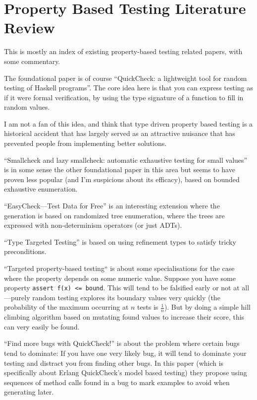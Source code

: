 \chapter{Property Based Testing Literature Review}

This is mostly an index of existing property-based testing related papers,
with some commentary.

The foundational paper is of course ``QuickCheck: a lightweight tool for random testing of Haskell programs''\cite{DBLP:conf/icfp/ClaessenH00}.
The core idea here is that you can express testing as if it were formal verification,
by using the type signature of a function to fill in random values.

I am not a fan of this idea,
and think that type driven property based testing is a historical accident that has largely served as an attractive nuisance that has prevented people from implementing better solutions.

``Smallcheck and lazy smallcheck: automatic exhaustive testing for small values''\cite{DBLP:conf/haskell/RuncimanNL08} is in some sense the other foundational paper in this area
but seems to have proven less popular (and I'm suspicious about its efficacy),
based on bounded exhaustive enumeration.

``EasyCheck---Test Data for Free''\cite{DBLP:conf/flops/ChristiansenF08} is an interesting extension where the generation is based on randomized tree enumeration,
where the trees are expressed with non-determinism operators (or just ADTs).

``Type Targeted Testing''\cite{DBLP:conf/esop/SeidelVJ15} is based on using refinement types to satisfy tricky preconditions.

``Targeted property-based testing``\cite{DBLP:conf/issta/LoscherS17} is about some specialisations for the case where the property depends on some numeric value.
Suppose you have some property \texttt{assert f(x) <= bound}.
This will tend to be falsified early or not at all---purely
random testing explores its boundary values very quickly (the probability of the maximum occurring at \(n\) tests is \(\frac{1}{n}\)).
But by doing a simple hill climbing algorithm based on mutating found values to increase their score,
this can very easily be found.

``Find more bugs with QuickCheck!''\cite{DBLP:conf/icse/HughesNSA16} is about the problem where certain bugs tend to dominate:
If you have one very likely bug,
it will tend to dominate your testing and distract you from finding other bugs.
In this paper (which is specifically about Erlang QuickCheck's model based testing) they propose using sequences of method calls found in a bug to mark examples to avoid when generating later.

